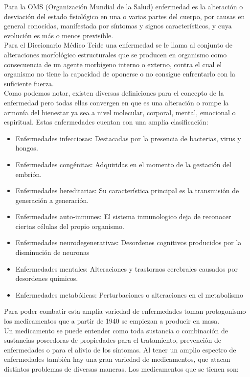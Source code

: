 Para la OMS (Organización Mundial de la Salud) enfermedad es la alteración o desviación del estado fisiológico en una o varias partes del cuerpo, por causas en general conocidas, manifestada por síntomas y signos característicos, y cuya evolución es más o menos previsible.\\
Para el Diccionario Médico Teide una enfermedad se le llama al conjunto de alteraciones morfológico estructurales que se producen en organismo como consecuencia de un agente morbígeno interno o externo, contra el cual el organismo no tiene la capacidad de oponerse o no consigue enfrentarlo con la suficiente fuerza.\\
Como podemos notar, existen diversas definiciones para el concepto de la enfermedad pero todas ellas convergen en que es una alteración o rompe la armonía del bienestar ya sea a nivel molecular, corporal, mental, emocional o espiritual.
Estas enfermedades cuentan con una amplia clasificación:
\begin{itemize}
	\item Enfermedades infecciosas: Destacadas por la presencia de bacterias, virus y hongos.
	\item Enfermedades congénitas: Adquiridas en el momento de la gestación del embrión.
	\item Enfermedades hereditarias: Su característica principal es la transmisión de generación a generación.
	\item Enfermedades auto-inmunes: El sistema inmunologico deja de reconocer ciertas células del propio organismo.
	\item Enfermedades neurodegenerativas: Desordenes cognitivos producidos por la disminución de neuronas 
	\item Enfermedades mentales: Alteraciones y trastornos cerebrales causados por desordenes químicos.
	\item Enfermedades metabólicas: Perturbaciones o alteraciones en el metabolismo
\end{itemize} 
Para poder combatir esta amplia variedad de enfermedades toman protagonismo los medicamentos que a partir de 1940 se empiezan a producir en masa.\\
Un medicamento se puede entender como toda sustancia o combinación de sustancias poseedoras de propiedades para el tratamiento, prevención de enfermedades o para el alivio de los síntomas.
Al tener un amplio espectro de enfermedades también hay una gran variedad de medicamentos, que atacan distintos problemas de diversas maneras.
Los medicamentos que se tienen son:
